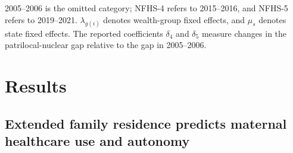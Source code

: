 \documentclass[12pt]{article}
\begin{document}
2005--2006 is the omitted category; NFHS-4 refers to 2015--2016, and NFHS-5 refers to 2019--2021. $\lambda_{g(i)}$ denotes wealth-group fixed effects, and $\mu_s$ denotes state fixed effects. The reported coefficients $\delta_4$ and $\delta_5$ measure changes in the patrilocal-nuclear gap relative to the gap in 2005--2006.





\section*{Results}





\subsection*{Extended family residence predicts maternal healthcare use and autonomy}
\end{document}
